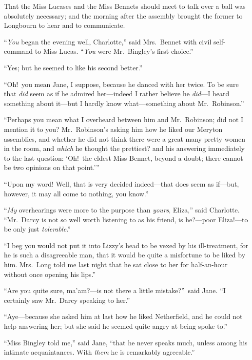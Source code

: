 \documentclass[12pt,english,oneside]{book}
\begin{document}
That the Miss Lucases and the Miss Bennets should meet to talk over
a ball was absolutely necessary; and the morning after the assembly
brought the former to Longbourn to hear and to communicate.

{}``\textit{You} began the evening well, Charlotte,'' said Mrs.\ Bennet
with civil self-command to Miss Lucas. {}``\textit{You} were Mr.\ Bingley's
first choice.''

{}``Yes; but he seemed to like his second better.''

{}``Oh!\ you mean Jane, I suppose, because he danced with her twice.
To be sure that \textit{did} seem as if he admired her\mbox{---}indeed
I rather believe he \textit{did}---I heard something about it\mbox{---}but
I hardly know what\mbox{---}something about Mr.\ Robinson.''

{}``Perhaps you mean what I overheard between him and Mr.\ Robinson;
did not I mention it to you? Mr.\ Robinson's asking him how he liked
our Meryton assemblies, and whether he did not think there were a
great many pretty women in the room, and \textit{which} he thought
the prettiest? and his answering immediately to the last question:
`Oh!\ the eldest Miss Bennet, beyond a doubt; there cannot be two
opinions on that point.'''

{}``Upon my word! Well, that is very decided indeed\mbox{---}that
does seem as if\mbox{---}but, however, it may all come to nothing,
you know.''

{}``\textit{My} overhearings were more to the purpose than \textit{yours},
Eliza,'' said Charlotte. {}``Mr.\ Darcy is not so well worth listening
to as his friend, is he?\mbox{---}poor Eliza!\mbox{---}to be only
just \textit{tolerable}.''

{}``I beg you would not put it into Lizzy's head to be vexed by his
ill-treatment, for he is such a disagreeable man, that it would be
quite a misfortune to be liked by him. Mrs.\ Long told me last night
that he sat close to her for half-an-hour without once opening his
lips.''

{}``Are you quite sure, ma'am?\mbox{---}is not there a little mistake?''\ said
Jane. {}``I certainly saw Mr.\ Darcy speaking to her.''

{}``Aye\mbox{---}because she asked him at last how he liked Netherfield,
and he could not help answering her; but she said he seemed quite
angry at being spoke to.''

{}``Miss Bingley told me,'' said Jane, {}``that he never speaks
much, unless among his intimate acquaintances. With \textit{them}
he is remarkably agreeable.''
\end{document}
